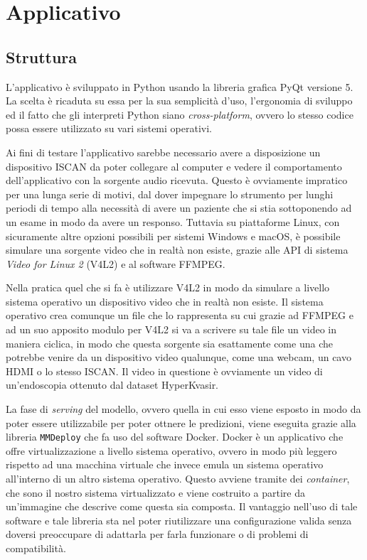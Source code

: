 \chapter{Applicativo}

\section{Struttura}

L'applicativo è sviluppato in Python usando la libreria grafica
PyQt versione 5.
La scelta è ricaduta su essa per la sua semplicità d'uso,
l'ergonomia di sviluppo ed il fatto che gli interpreti
Python siano {\it cross-platform}, ovvero lo stesso codice
possa essere utilizzato su vari sistemi operativi.

Ai fini di testare l'applicativo sarebbe necessario
avere a disposizione un dispositivo ISCAN da poter collegare
al computer e vedere il comportamento dell'applicativo con
la sorgente audio ricevuta.
Questo è ovviamente impratico per una lunga serie di motivi,
dal dover impegnare lo strumento per lunghi periodi di tempo
alla necessità di avere un paziente che si stia sottoponendo
ad un esame in modo da avere un responso.
Tuttavia su piattaforme Linux, con sicuramente altre opzioni
possibili per sistemi Windows e macOS, è possibile simulare
una sorgente video che in realtà non esiste, grazie alle API
di sistema {\it Video for Linux 2} (V4L2) e al software
FFMPEG.

Nella pratica quel che si fa è utilizzare V4L2 in modo da
simulare a livello sistema operativo un dispositivo video che
in realtà non esiste.
Il sistema operativo crea comunque un file che lo rappresenta
su cui grazie ad FFMPEG e ad un suo apposito modulo per V4L2
si va a scrivere su tale file un video in maniera ciclica,
in modo che questa sorgente sia esattamente come una che
potrebbe venire da un dispositivo video qualunque, come una
webcam, un cavo HDMI o lo stesso ISCAN.
Il video in questione è ovviamente un video di un'endoscopia
ottenuto dal dataset HyperKvasir.

La fase di {\it serving} del modello, ovvero quella in cui esso
viene esposto in modo da poter essere utilizzabile per poter
ottnere le predizioni, viene eseguita grazie alla libreria
{\tt MMDeploy}\cite{mmdeploy} che fa uso del software Docker.
Docker è un applicativo che offre virtualizzazione a livello
sistema operativo, ovvero in modo più leggero rispetto ad una
macchina virtuale che invece emula un sistema operativo
all'interno di un altro sistema operativo.
Questo avviene tramite dei {\it container}, che sono il nostro
sistema virtualizzato e viene costruito a partire da un'immagine
che descrive come questa sia composta.
Il vantaggio nell'uso di tale software e tale libreria sta nel
poter riutilizzare una configurazione valida senza doversi
preoccupare di adattarla per farla funzionare o di problemi di 
compatibilità.




